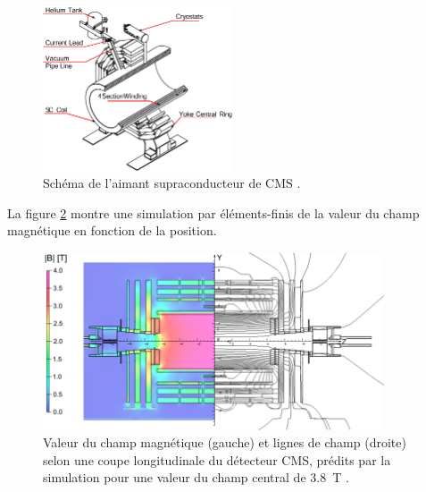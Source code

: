 \begin{figure}[ht!]
	\centering
	\includegraphics[width=0.50\textwidth]{CMS/MAGNET.png}
	\captionsetup{type=figure}\caption{Schéma de l'aimant supraconducteur de CMS \cite{magnet}.}
	\label{MAGNET}
\end{figure}
\newpage
La figure \ref{CHAMP} montre une simulation par éléments-finis de la valeur du champ magnétique en fonction de la position.
\begin{figure}[ht!]
	\centering
	\includegraphics[width=0.90\textwidth]{CMS/CHAMP.png}
	\captionsetup{type=figure}\caption{Valeur du champ magnétique (gauche) et lignes de champ (droite) selon une coupe longitudinale du détecteur CMS, prédits par la simulation pour une valeur du champ central de \SI{3.8}{\tesla} \cite{Chatrchyan:2009si}.}
	\label{CHAMP}
\end{figure}
